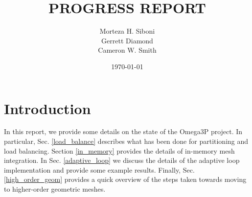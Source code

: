\documentclass[review,12pt]{elsarticle_summary_report}
\begin{document}
\title{PROGRESS REPORT}%

\author[]{Morteza H. Siboni \\
Gerrett Diamond \\
Cameron W. Smith}



\date{\today}





\maketitle




\section{Introduction}
In this report, we provide some details on the state of the Omega3P project. In particular, Sec. \ref{load_balance} describes what has been done for partitioning and load balancing. Section \ref{in_memory} provides the details of in-memory mesh integration. In Sec. \ref{adaptive_loop} we discuss the details of the adaptive loop implementation and provide some example results. Finally, Sec. \ref{high_order_geom} provides a quick overview of the steps taken towards moving to higher-order geometric meshes.
\end{document}
